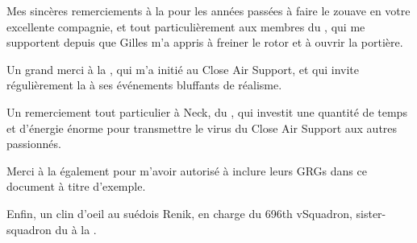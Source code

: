 %

\begin{imini}
Mes sincères remerciements à la \thirdwing{} pour les années passées à faire le zouave en votre excellente compagnie, et tout particulièrement aux membres du \rgt{} \inmem{}, qui me supportent depuis que Gilles m'a appris à freiner le rotor et à ouvrir la portière.


Un grand merci à la \onethreetwo{}, qui m'a initié au Close Air Support, et qui invite régulièrement la \thirdwing{} à ses événements bluffants de réalisme.


Un remerciement tout particulier à Neck, du \onethreetwo{}, qui investit une quantité de temps et d'énergie énorme pour transmettre le virus du Close Air Support aux autres passionnés.


Merci à la \onethreetwo{} également pour m'avoir autorisé à inclure leurs GRGs dans ce document à titre d'exemple.


Enfin, un clin d'oeil au suédois Renik, en charge du 696th vSquadron, sister-squadron du \rgt{} à la \onethreetwo{}.
\end{imini}

\vfil